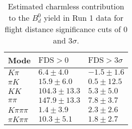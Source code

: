 \begin{table}
  \centering
  \begin{tabular}{lll}
      \toprule
      Mode & $\mathrm{FDS} > 0$ & $\mathrm{FDS} > 3\sigma$ \\
      \midrule
      $K\pi$ & $6.4 \pm 4.0$ & $-1.5 \pm 1.6$ \\
      $\pi K$ & $15.9 \pm 6.0$ & $0.5 \pm 12.5$ \\
      $KK$ & $104.3 \pm 13.3$ & $5.3 \pm 5.0$ \\
      $\pi\pi$ & $147.9 \pm 13.3$ & $7.8 \pm 3.7$ \\
      $K\pi\pi\pi$ & $1.4 \pm 3.9$ & $2.3 \pm 2.6$ \\
      $\pi K\pi\pi$ & $10.3 \pm 5.1$ & $1.8 \pm 2.7$ \\
      \bottomrule
  \end{tabular}
  \caption{\small Estimated charmless contribution to the $B^{0}_{d}$ yield in Run 1 data for flight distance significance cuts of 0  and $3\sigma$.}
\label{tab:charmless_yields_Bd_run_1}
\end{table}
